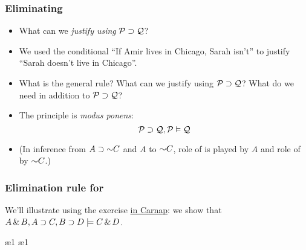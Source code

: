\begin{frame}
  \frametitle{Eliminating \eif}

  \begin{itemize}[<+->]
    \item What can we \emph{justify using} $\mathcal{P} \supset \mathcal{Q}$?
    \item We used the conditional ``If Amir lives in Chicago, Sarah
    isn't'' to justify ``Sarah doesn't live in
    Chicago''.
    \item What is the general rule? What can we justify using
    $\mathcal{P} \supset \mathcal{Q}$? What do we need in addition to $\mathcal{P} \supset \mathcal{Q}$?
    \item The principle is \emph{modus ponens}:
    \[ \mathcal{P} \supset \mathcal{Q}, \mathcal{P} \vDash \mathcal{Q}\]
    \item (In inference from $A \eif \enot C$ and $A$ to $\enot C$, role
    of  is played by $A$ and role of  by $\enot C$.)
  \end{itemize}
\end{frame}

\begin{frame}
  \frametitle{Elimination rule for \eif}
  \begin{fitchproof}
     
  \end{fitchproof}

  We'll illustrate using the exercise
  \href{https://carnap.io/shared/rzach@ucalgary.ca/Practice\%20Problems\%20IV.md}{in
  Carnap}: we
  show that $A \,\&\, B, A \supset C, B \supset D \models C \,\&\, D$.
\end{frame}

\begin{frame}
  \begin{fitchproof}
    \ae{1}
    \ae{1}
  \end{fitchproof}
\end{frame}


